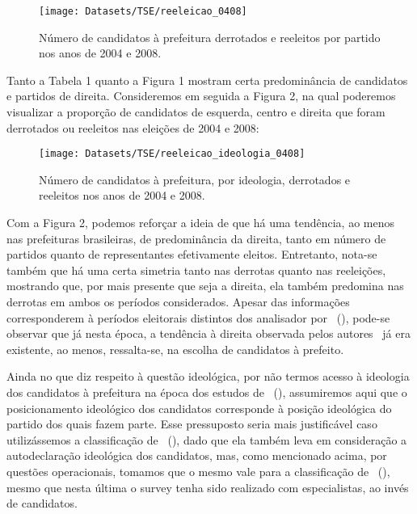 \documentclass[
	12pt,				%
	openright,			%
	twoside,			%
	a4paper,			%
	openany,
	english,			%
	brazil				%
	]{abntex2}
\begin{document}
\begin{figure}[htp!]
	\centering
	\hfill\texttt{[image: Datasets/TSE/reeleicao\_0408]}\hspace{\fill}
	\caption{Número de candidatos à prefeitura derrotados e reeleitos por partido nos anos de 2004 e 2008.}
	\label{fig:reelecao0408}
\end{figure}

Tanto a Tabela 1 quanto a Figura 1 mostram certa predominância de candidatos e partidos de direita. Consideremos em seguida a Figura 2, na qual poderemos visualizar a proporção de candidatos de esquerda, centro e direita que foram derrotados ou reeleitos nas eleições de 2004 e 2008:

\begin{figure}[htp!]
	\centering
	\hfill\texttt{[image: Datasets/TSE/reeleicao\_ideologia\_0408]}\hspace{\fill}
	\caption{Número de candidatos à prefeitura, por ideologia, derrotados e reeleitos nos anos de 2004 e 2008.}
	\label{fig:reeleicaoideologia0408}
\end{figure}

Com a Figura 2, podemos reforçar a ideia de que há uma tendência, ao menos nas prefeituras brasileiras, de predominância da direita, tanto em número de partidos quanto de representantes efetivamente eleitos. Entretanto, nota-se também que há uma certa simetria tanto nas derrotas quanto nas reeleições, mostrando que, por mais presente que seja a direita, ela também predomina nas derrotas em ambos os períodos considerados. Apesar das informações corresponderem à períodos eleitorais distintos dos analisador por ~(\citeyear{fuks2020afeto}), pode-se observar que já nesta época, a tendência à direita observada pelos autores~\cite{fuks2020afeto} já era existente, ao menos, ressalta-se, na escolha de candidatos à prefeito.

Ainda no que diz respeito à questão ideológica, por não termos acesso à ideologia dos candidatos à prefeitura na época dos estudos de ~(\citeyear{Brollo2013Aug}), assumiremos aqui que o posicionamento ideológico dos candidatos corresponde à posição ideológica do partido dos quais fazem parte. Esse pressuposto seria mais justificável caso utilizássemos a classificação de ~(\citeyear{Power2009}), dado que ela também leva em consideração a autodeclaração ideológica dos candidatos, mas, como mencionado acima, por questões operacionais, tomamos que o mesmo vale para a classificação de ~(\citeyear{Bolognesi2022Sep}), mesmo que nesta última o survey tenha sido realizado com especialistas, ao invés de candidatos.
\end{document}
